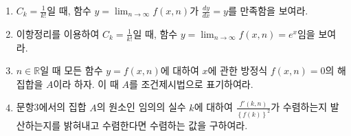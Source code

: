 \documentclass[fleqn]{article}
\begin{document}
\ExamNameLine
{}

\begin{enumerate}
   \item $C_k=\frac{1}{k!} $일 때, 함수 $y=\lim_{n \to \infty} f(x,n)$가 $\frac{dy}{dx} =y$를 만족함을 보여라.
        \noanswer[1in]
        
   \item 이항정리를 이용하여 $C_k=\frac{1}{k!} $일 때, 함수 $y=\lim_{n \to \infty} f(x,n)=e^x$임을 보여라.
        \noanswer[1in]
        
   \item $n\in\mathbb{R}$일 때 모든 함수 $y=f(x,n)$에 대하여 $x$에 관한 방정식 $f(x,n)=0$의 해집합을 $A$이라 하자. 이 때 $A$를 조건제시법으로 표기하여라.
        \noanswer[1in]
   \item 문항3에서의 집합 $A$의 원소인 임의의 실수 $k$에 대하여 $\frac{f'(k,n)}{\left\lbrace f(k)\right\rbrace ^2}$가 수렴하는지 발산하는지를 밝혀내고 수렴한다면 수렴하는 값을 구하여라.
        \noanswer[1in]     

\end{enumerate}
\end{document}
